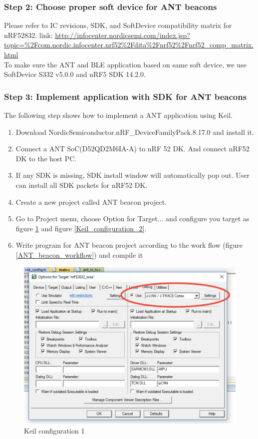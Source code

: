 \documentclass{article}
\begin{document}
\subsubsection{Step 2: Choose proper soft device for ANT beacons}
Please refer to IC revisions, SDK, and SoftDevice compatibility matrix for nRF52832. link: 
\url{http://infocenter.nordicsemi.com/index.jsp?topic=%2Fcom.nordic.infocenter.nrf52%2Fdita%2Fnrf52%2Fnrf52_comp_matrix.html} \\
To make sure the ANT and BLE application based on same soft device, we use SoftDevice S332 v5.0.0 and nRF5 SDK 14.2.0.

\subsubsection{Step 3: Implement application with SDK for ANT beacons}
The following step shows how to implement a ANT application using Keil. \\
\begin{enumerate}

\item Download NordicSemiconductor.nRF\_DeviceFamilyPack.8.17.0 and install it.

\item Connect a ANT SoC(D52QD2M6IA-A) to nRF 52 DK. And connect nRF52 DK to the host PC.

\item If any SDK is missing, SDK install window will automatically pop out. User can install all SDK packets for nRF52 DK.

\item Create a new project called ANT beacon project.

\item Go to Project menu, choose Option for Target... and configure you target as figure  \ref{Keil_configuration_1} and figure \ref{Keil_configuration_2}.

\item Write program for ANT beacon project according to the work flow (figure  \ref{ANT_beacon_workflow}) and compile it

\end{enumerate}

\begin{figure}[!h]
\begin{center}
\caption{Keil configuration 1}
\label{Keil_configuration_1}
\includegraphics[width=0.5\columnwidth]{Figures/Keil_config_1.png}
\end{center}
\end{figure}
\end{document}
